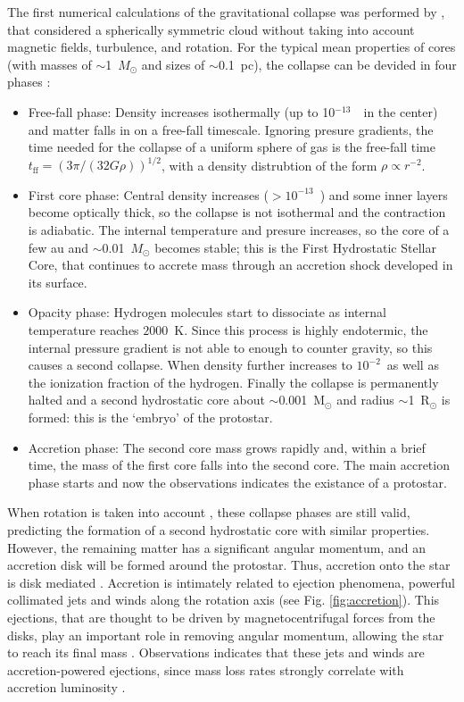 \documentclass[12pt]{mythesis}
\begin{document}
The first numerical calculations of the gravitational collapse was performed by \citet{larson1969}, that considered a spherically symmetric cloud without taking into account magnetic fields, turbulence, and rotation. For the typical mean properties of cores (with masses of $\sim$1~$M_\odot$ and sizes of $\sim$0.1~pc), the collapse can be devided in four phases \citep{larson2003, estalella2008, schulz2012}:
\begin{itemize}
	\item Free-fall phase: Density increases isothermally (up to 10$^{-13}$~\gcmcu\ in the center) and matter falls in on a free-fall timescale. Ignoring presure gradients, the time needed for the collapse of a uniform sphere of gas is the free-fall time $t_\mathrm{ff}=(3\pi / (32G\rho))^{1/2}$, with a density distrubtion of the form $\rho\propto r^{-2}$.
	\item First core phase: Central density increases ($>10^{-13}$~\gcmcu) and some inner layers become optically thick, so the collapse is not isothermal and the contraction is adiabatic. The internal temperature and presure increases, so the core of a few au and $\sim$0.01~$M_\odot$ becomes stable; this is the First Hydrostatic Stellar Core, that continues to accrete mass through an accretion shock developed in its surface. 
	\item Opacity phase: Hydrogen molecules start to dissociate as internal temperature reaches $2000$~K. Since this process is highly endotermic, the internal pressure gradient is not able to enough to counter gravity, so this causes a second collapse. When density further increases to $10^{-2}$~\gcmcu as well as the ionization fraction of the hydrogen. Finally the collapse is permanently halted and a second hydrostatic core about $\sim$0.001~M$_\odot$ and radius $\sim$1~R$_\odot$ is formed: this is the `embryo' of the protostar.
	\item Accretion phase: The second core mass grows rapidly and, within a brief time, the mass of the first core falls into the second core. The main accretion phase starts and now the observations indicates the existance of a protostar. 
\end{itemize}

When rotation is taken into account \citep{bate1998}, these collapse phases are still valid, predicting the formation of a second hydrostatic core with similar properties. However, %
the remaining matter has a significant angular momentum, and an accretion disk will be formed around the protostar. Thus, accretion onto the star is disk mediated \citep{hartmann2016}. Accretion is intimately related to ejection phenomena, powerful collimated jets and winds along the rotation axis (see Fig. \ref{fig:accretion}). This ejections, that are thought to be driven by magnetocentrifugal forces from the disks, play an important role in removing angular momentum, allowing the star to reach its final mass \citep[e.g.][]{pudritz2019}. Observations indicates that these jets and winds are accretion-powered ejections, since mass loss rates strongly correlate with accretion luminosity \citep{cabrit1990, hartigan1995, cabrit2007, ellerbroek2013, natta2014, lee2020}.
\end{document}
